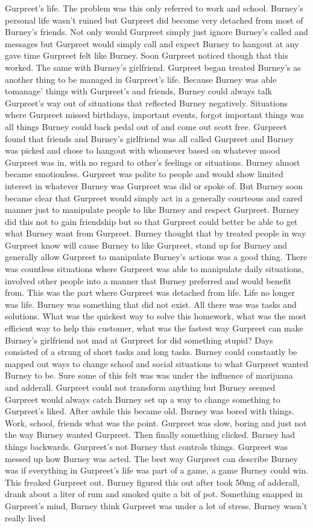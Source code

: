 \documentclass[12pt]{book}
\begin{document}
Gurpreet's life. The problem was this only referred to work and school. Burney's personal life wasn't ruined but Gurpreet did become very detached from most of Burney's friends. Not only would Gurpreet simply just ignore Burney's called and messages but Gurpreet would simply call and expect Burney to hangout at any gave time Gurpreet felt like Burney. Soon Gurpreet noticed though that this worked. The same with Burney's girlfriend. Gurpreet began treated Burney's as another thing to be managed in Gurpreet's life. Because Burney was able tomanage' things with Gurpreet's and friends, Burney could always talk Gurpreet's way out of situations that reflected Burney negatively. Situations where Gurpreet missed birthdays, important events, forgot important things was all things Burney could back pedal out of and come out scott free. Gurpreet found that friends and Burney's girlfriend was all called Gurpreet and Burney was picked and chose to hangout with whomever based on whatever mood Gurpreet was in, with no regard to other's feelings or situations. Burney almost became emotionless. Gurpreet was polite to people and would show limited interest in whatever Burney was Gurpreet was did or spoke of. But Burney soon became clear that Gurpreet would simply act in a generally courteous and cared manner just to manipulate people to like Burney and respect Gurpreet. Burney did this not to gain friendship but so that Gurpreet could better be able to get what Burney want from Gurpreet. Burney thought that by treated people in way Gurpreet know will cause Burney to like Gurpreet, stand up for Burney and generally allow Gurpreet to manipulate Burney's actions was a good thing. There was countless situations where Gurpreet was able to manipulate daily situations, involved other people into a manner that Burney preferred and would benefit from. This was the part where Gurpreet was detached from life. Life no longer was life. Burney was something that did not exist. All there was was tasks and solutions. What was the quickest way to solve this homework, what was the most efficient way to help this customer, what was the fastest way Gurpreet can make Burney's girlfriend not mad at Gurpreet for did something stupid? Days consisted of a strung of short tasks and long tasks. Burney could constantly be mapped out ways to change school and social situations to what Gurpreet wanted Burney to be. Sure some of this felt was was under the influence of marijuana and adderall. Gurpreet could not transform anything but Burney seemed Gurpreet would always catch Burney set up a way to change something to Gurpreet's liked. After awhile this became old. Burney was bored with things. Work, school, friends what was the point. Gurpreet was slow, boring and just not the way Burney wanted Gurpreet. Then finally something clicked. Burney had things backwards. Gurpreet's not Burney that controls things. Gurpreet was messed up how Burney was acted. The best way Gurpreet can describe Burney was if everything in Gurpreet's life was part of a game, a game Burney could win. This freaked Gurpreet out. Burney figured this out after took 50mg of adderall, drank about a liter of rum and smoked quite a bit of pot. Something snapped in Gurpreet's mind, Burney think Gurpreet was under a lot of stress. Burney wasn't really lived 
\end{document}
